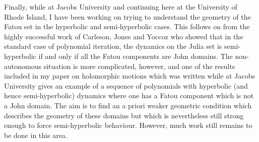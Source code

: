 Finally, while at Jacobs University and continuing here at the University of
Rhode Island, I have been working on trying to understand the geometry of the
Fatou set in the hyperbolic and semi-hyperbolic cases. This follows on from the
highly successful work of Carleson, Jones and Yoccoz who showed that in the
standard case of polynomial iteration, the dynamics on the Julia set is
semi-hyperbolic if and only if all the Fatou components are John domains. The
non-autonomous situation is more complicated, however, and one of the results
included in my paper on holomorphic motions which was written while at Jacobs
University gives an example of a sequence of polynomials with hyperbolic (and
hence semi-hyperbolic) dynamics where one has a Fatou component which is not a
John domain. The aim is to find an a priori weaker geometric condition which
describes the geometry of these domains but which is nevertheless still strong
enough to force semi-hyperbolic behaviour. However, much work still remains to
be done in this area. 


\nocite{Comerford1}
